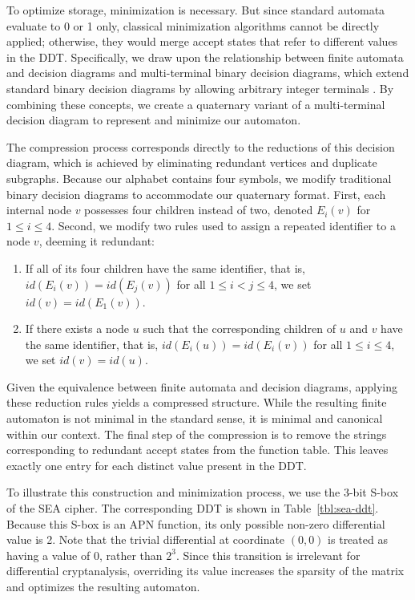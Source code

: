 To optimize storage, minimization is necessary. But since standard automata evaluate to 0 or 1 only, classical minimization algorithms cannot be directly applied; otherwise, they would merge accept states that refer to different values in the DDT. Specifically, we draw upon the relationship between finite automata and decision diagrams \cite{KimuraAndClarke1990} and multi-terminal binary decision diagrams, which extend standard binary decision diagrams by allowing arbitrary integer terminals \cite{FujitaEtAl1997}. By combining these concepts, we create a quaternary variant of a multi-terminal decision diagram to represent and minimize our automaton.

The compression process corresponds directly to the reductions of this decision diagram, which is achieved by eliminating redundant vertices and duplicate subgraphs. Because our alphabet contains four symbols, we modify traditional binary decision diagrams \cite{Bryant1986} to accommodate our quaternary format. First, each internal node $v$ possesses four children instead of two, denoted $E_{i}(v)$ for $1 \leq i \leq 4$. Second, we modify two rules used to assign a repeated identifier to a node $v$, deeming it redundant:

\begin{enumerate}
    \item If all of its four children have the same identifier, that is, $id(E_{i}(v)) = id(E_{j}(v))$ for all $1 \leq i < j \leq 4$, we set $id(v) = id(E_{1}(v))$.
    
    \item If there exists a node $u$ such that the corresponding children of $u$ and $v$ have the same identifier, that is, $id(E_{i}(u)) = id(E_{i}(v))$ for all $1 \leq i \leq 4$, we set $id(v) = id(u)$.
\end{enumerate}

Given the equivalence between finite automata and decision diagrams, applying these reduction rules yields a compressed structure. While the resulting finite automaton is not minimal in the standard sense, it is minimal and canonical within our context. The final step of the compression is to remove the strings corresponding to redundant accept states from the function table. This leaves exactly one entry for each distinct value present in the DDT.

To illustrate this construction and minimization process, we use the 3-bit S-box of the SEA cipher. The corresponding DDT is shown in Table~\ref{tbl:sea-ddt}. Because this S-box is an APN function, its only possible non-zero differential value is 2. Note that the trivial differential at coordinate $(0,0)$ is treated as having a value of 0, rather than $2^{3}$. Since this transition is irrelevant for differential cryptanalysis, overriding its value increases the sparsity of the matrix and optimizes the resulting automaton.

